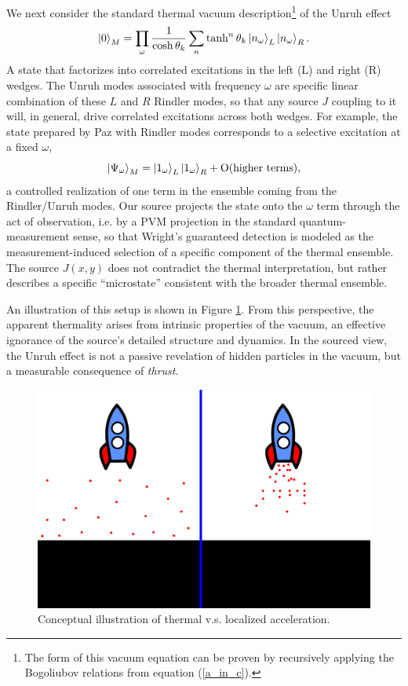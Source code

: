 \documentclass[12pt,a4paper]{article}
\begin{document}
{We next consider the standard thermal vacuum description\footnote{The form of this vacuum equation can be proven by recursively applying the Bogoliubov relations from equation (\ref{a_in_c}).} of the Unruh effect
\begin{equation}
  \ket{0}_M = \prod_{\omega} \frac{1}{\cosh{\theta_k}} \sum_n \tanh^n{\theta_k} \ket{n_\omega}_{L} \ket{n_\omega}_{R}.
  \label{vacuum}
\end{equation}
A state that factorizes into correlated excitations in the left (L) and right (R) wedges. The Unruh modes associated with frequency $\omega$ are specific linear combination of these $L$ and $R$ Rindler modes, so that any source $J$ coupling to it will, in general, drive correlated excitations across both wedges. For example, the state prepared by Paz with Rindler modes corresponds to a selective excitation at a fixed $\omega$,
\begin{equation}
  \ket{\Psi_\omega}_M = \ket{1_\omega}_L \ket{1_\omega}_R + \text{O(higher terms)},
  \label{one_fock}
\end{equation}
a controlled realization of one term in the ensemble coming from the Rindler/Unruh modes. Our source projects the state onto the $\omega$ term through the act of observation, i.e. by a PVM projection in the standard quantum-measurement sense, so that Wright’s guaranteed detection is modeled as the measurement-induced selection of a specific component of the thermal ensemble. The source $J(x,y)$ does not contradict the thermal interpretation, but rather describes a specific ``microstate'' consistent with the broader thermal ensemble.

An illustration of this setup is shown in Figure \ref{rocket_inertial}. From this perspective, the apparent thermality arises from intrinsic properties of the vacuum, an effective ignorance of the source's detailed structure and dynamics. In the sourced view, the Unruh effect is not a passive revelation of hidden particles in the vacuum, but a measurable consequence of {\it thrust}.


\begin{figure}[h]
\centering
\includegraphics[scale=0.5]{rocket_inertial.png}
\caption{Conceptual illustration of thermal v.s. localized acceleration.}
\label{rocket_inertial}
\end{figure}

}
\end{document}
